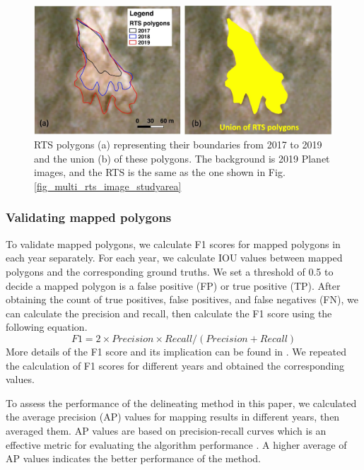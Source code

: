 \documentclass[authoryear,preprint,review,12pt]{elsarticle}
\begin{document}
\begin{figure} 
	\centering
	\includegraphics[width=14cm]{figs/rts_expanding_example_trim.jpg}
	\caption{RTS polygons (a) representing their boundaries from 2017 to 2019 and the union (b) of these polygons. The background is 2019 Planet images, and the RTS is the same as the one shown in Fig. \ref{fig_multi_rts_image_studyarea}}
	\label{fig_rts_expanding}
\end{figure}


\subsubsection{Validating mapped polygons}
\label{sec_validate_mapped_polygons}

To validate mapped polygons, we calculate F1 scores \citep{huang2020using} for mapped polygons in each year separately. 
For each year, we calculate IOU values between mapped polygons and the corresponding ground truths. 
We set a threshold of 0.5 to decide a mapped polygon is a false positive (FP) or true positive (TP).
After obtaining the count of true positives, false positives, and false negatives (FN), we can calculate the precision and recall, then calculate the F1 score using the following equation. 
\begin{equation}
F1=2 \times Precision \times Recall / (Precision + Recall)
\label{equ_f1score}
\end{equation}
More details of the F1 score and its implication can be found in \cite{huang2020using}.
We repeated the calculation of F1 scores for different years and obtained the corresponding values. 

To assess the performance of the delineating method in this paper, we calculated the average precision (AP) values for mapping results in different years, then averaged them. 
AP values are based on precision-recall curves which is an effective metric for evaluating the algorithm performance \citep{huang2020using}.
A higher average of AP values indicates the better performance of the method. 
\end{document}
